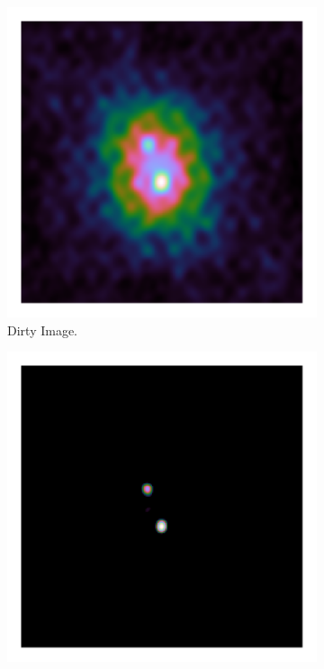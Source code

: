 \begin{figure}[h]
	\centering
	\begin{subfigure}[b]{0.3\linewidth}
		\includegraphics[width=\linewidth, clip, trim= 0.125in 0.125in 0.125in 0.125in]{./chapters/03.cd/simulated/dirty.png}
		\caption{Dirty Image.}
		\label{cd:serial:aid:dirty}
	\end{subfigure}
	\begin{subfigure}[b]{0.3\linewidth}
		\includegraphics[width=\linewidth, clip, trim= 0.125in 0.125in 0.125in 0.125in]{./chapters/03.cd/simulated/elasticNet.png}

\end{subfigure}
\end{figure}
